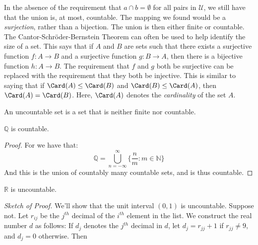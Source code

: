 \documentclass[crop=false,class=book,oneside]{standalone}
\begin{document}
            In the absence of the requirement that
            $a\cap{b}=\emptyset$ for all pairs in $\mathcal{U}$,
            we still have that the union is, at most, countable.
            The mapping we found would be a
            \textit{surjection}, rather than a bijection.
            The union is then either finite or countable. The
            Cantor-Schr\"{o}der-Bernstein Theorem can often be
            used to help identify the size of a set. This says
            that if $A$ and $B$ are sets such that there exists
            a surjective function $f:A\rightarrow{B}$ and a
            surjective function $g:B\rightarrow{A}$, then there
            is a bijective function $h:A\rightarrow{B}$. The
            requirement that $f$ and $g$ both be surjective
            can be replaced with the requirement that they both
            be injective. This is similar to saying that if
            $\Card(A)\leq\Card(B)$ and $\Card(B)\leq\Card(A)$,
            then $\Card(A)=\Card(B)$. Here, $\Card(A)$ denotes
            the \textit{cardinality} of the set $A$.
            \begin{definition}
                An uncountable set is a set that is
                neither finite nor countable.
            \end{definition}
            \begin{theorem}
                $\mathbb{Q}$ is countable.
            \end{theorem}
            \begin{proof}
                For we have that:
                \begin{equation}
                    \mathbb{Q}=
                    \bigcup_{n=-\infty}^{\infty}
                    \Big\{\frac{n}{m}:m\in\mathbb{N}\Big\}
                \end{equation}
                And this is the union of countably
                many countable sets, and is thus countable.
            \end{proof}
            \begin{theorem}
                $\mathbb{R}$ is uncountable.
            \end{theorem}
            \textit{Sketch of Proof.} We'll show that the unit
            interval $(0,1)$ is uncountable. Suppose not.
            Let $r_{ij}$ be the $j^{th}$ decimal of the $i^{th}$
            element in the list. We construct the real number
            $d$ as follows: If $d_{j}$ denotes the $j^{th}$
            decimal in $d$, let $d_{j}=r_{jj}+1$ if
            $r_{jj}\ne{9}$, and $d_{j}=0$ otherwise. Then
\end{document}
